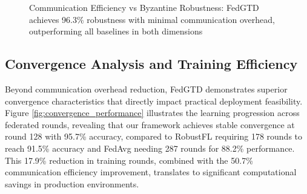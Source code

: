 \documentclass[12pt,a4paper]{article}
\theoremstyle{definition}
\begin{document}
\begin{figure}[H]
\centering
{}
\caption{Communication Efficiency vs Byzantine Robustness: FedGTD achieves 96.3\% robustness with minimal communication overhead, outperforming all baselines in both dimensions}
\label{fig:efficiency_robustness}
\end{figure}

\subsection{Convergence Analysis and Training Efficiency}

Beyond communication overhead reduction, FedGTD demonstrates superior convergence characteristics that directly impact practical deployment feasibility. Figure \ref{fig:convergence_performance} illustrates the learning progression across federated rounds, revealing that our framework achieves stable convergence at round 128 with 95.7\% accuracy, compared to RobustFL requiring 178 rounds to reach 91.5\% accuracy and FedAvg needing 287 rounds for 88.2\% performance. This 17.9\% reduction in training rounds, combined with the 50.7\% communication efficiency improvement, translates to significant computational savings in production environments.
\end{document}
